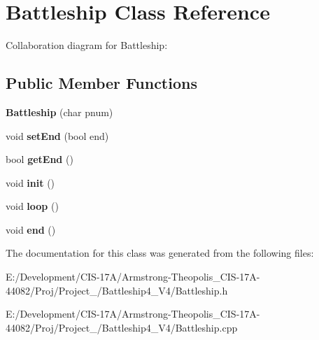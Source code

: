 \hypertarget{class_battleship}{}\section{Battleship Class Reference}
\label{class_battleship}


Collaboration diagram for Battleship\+:
\subsection*{Public Member Functions}
\begin{DoxyCompactItemize}
\item 
\mbox{\label{class_battleship_a14880c67c9ecf07819fbb9a956f1b6d7}} 
{\bfseries Battleship} (char pnum)
\item 
\mbox{\label{class_battleship_abeaf950c129ad414f434b5782d7fec3b}} 
void {\bfseries set\+End} (bool end)
\item 
\mbox{\label{class_battleship_a9bcee5d9e46cdbd20bed4d097214884d}} 
bool {\bfseries get\+End} ()
\item 
\mbox{\label{class_battleship_aaaef87520611b1e607e876063c0bf521}} 
void {\bfseries init} ()
\item 
\mbox{\label{class_battleship_adea0aebd6980690e1cd9b42cd6bb5e90}} 
void {\bfseries loop} ()
\item 
\mbox{\label{class_battleship_a59f0ca6f3635cb98f1de43016099e072}} 
void {\bfseries end} ()
\end{DoxyCompactItemize}


The documentation for this class was generated from the following files\+:\begin{DoxyCompactItemize}
\item 
E\+:/\+Development/\+C\+I\+S-\/17\+A/\+Armstrong-\/\+Theopolis\+\_\+\+C\+I\+S-\/17\+A-\/44082/\+Proj/\+Project\+\_/\+Battleship4\+\_\+\+V4/Battleship.\+h\item 
E\+:/\+Development/\+C\+I\+S-\/17\+A/\+Armstrong-\/\+Theopolis\+\_\+\+C\+I\+S-\/17\+A-\/44082/\+Proj/\+Project\+\_/\+Battleship4\+\_\+\+V4/Battleship.\+cpp\end{DoxyCompactItemize}
